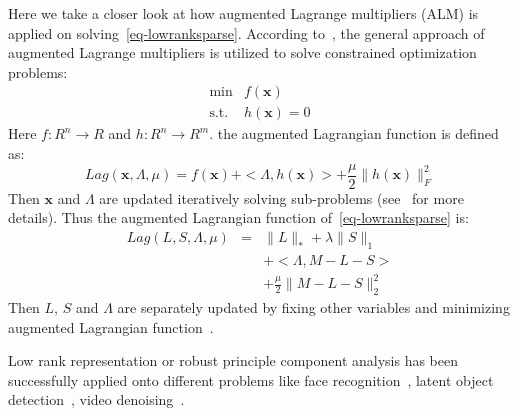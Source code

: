 Here we take a closer look at how augmented Lagrange multipliers (ALM) is applied on solving~\eqref{eq-lowranksparse}.
According to~\cite{bertsekas1982constrained}, the general approach of augmented Lagrange multipliers is utilized to solve constrained optimization problems:
\begin{equation}
\label{eq-generalalm}
\begin{array}{cl}
\min & f(\mathbf{x})\\
\mathrm{s.t.} & h(\mathbf{x}) = 0
\end{array}
\end{equation} 
Here $f: R^n\rightarrow R$ and $h: R^n\rightarrow R^m$.
the augmented Lagrangian function is defined as:
\begin{equation}
Lag(\mathbf{x},\Lambda,\mu)=f(\mathbf{x})+<\Lambda,h(\mathbf{x})>+\frac{\mu}{2}\|h(\mathbf{x})\|_F^2
\end{equation}
Then $\mathbf{x}$ and $\Lambda$ are updated iteratively solving sub-problems (see~\cite{bertsekas1999nonlinear} for more details).
Thus the augmented Lagrangian function of~\eqref{eq-lowranksparse} is:
\begin{equation}
\label{eq-lowrankalm}
\begin{array}{ccl}
Lag(L,S,\Lambda,\mu)& =& \|L\|_* + \lambda\|S\|_1 \\
& &+ <\Lambda,M-L-S>\\
& & +\frac{\mu}{2}\|M-L-S\|_2^2
\end{array}
\end{equation}
Then $L$, $S$ and $\Lambda$ are separately updated by fixing other variables and minimizing augmented Lagrangian function~\cite{lin2010augmented}.

Low rank representation or robust principle component analysis has been successfully applied onto different problems like face recognition~\cite{ma2012sparse}, latent object detection~\cite{shen2012unified}, video denoising~\cite{ji2010robust}.

